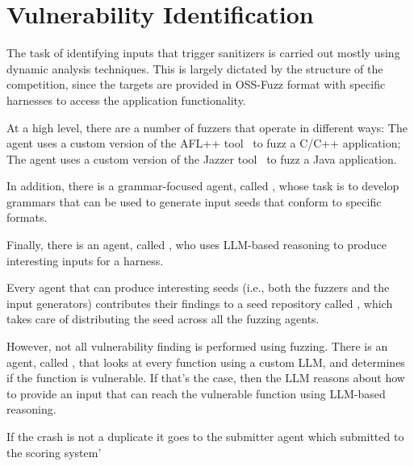 \section{Vulnerability Identification}
\label{detection}

The task of identifying inputs that trigger sanitizers is carried out mostly using dynamic analysis techniques.
This is largely dictated by the structure of the competition, since the targets are provided in OSS-Fuzz format with specific harnesses to access the application functionality.

At a high level, there are a number of fuzzers that operate in different ways: The \afluzzer agent uses a custom version of the AFL++ tool~\cite{aflplusplus} to fuzz a C/C++ application; The \jazzmine agent uses a custom version of the Jazzer tool~\cite{jazzer} to fuzz a Java application.

In addition, there is a grammar-focused agent, called \grammarguy, whose task is to develop grammars that can be used to generate input seeds that conform to specific formats.

Finally, there is an agent, called \quickseed, who uses LLM-based reasoning to produce interesting inputs for a harness.

Every agent that can produce interesting seeds (i.e., both the fuzzers and the input generators) contributes their findings to a seed repository called \seedsync, which takes care of distributing the seed across all the fuzzing agents.

However, not all vulnerability finding is performed using fuzzing.
There is an agent, called \lluminar, that looks at every function using a custom LLM, and determines if the function is vulnerable.
If that's the case, then the LLM reasons about how to provide an input that can reach the vulnerable function using LLM-based reasoning. 













If the crash is not a duplicate it goes to the submitter agent which submitted to the scoring system'

